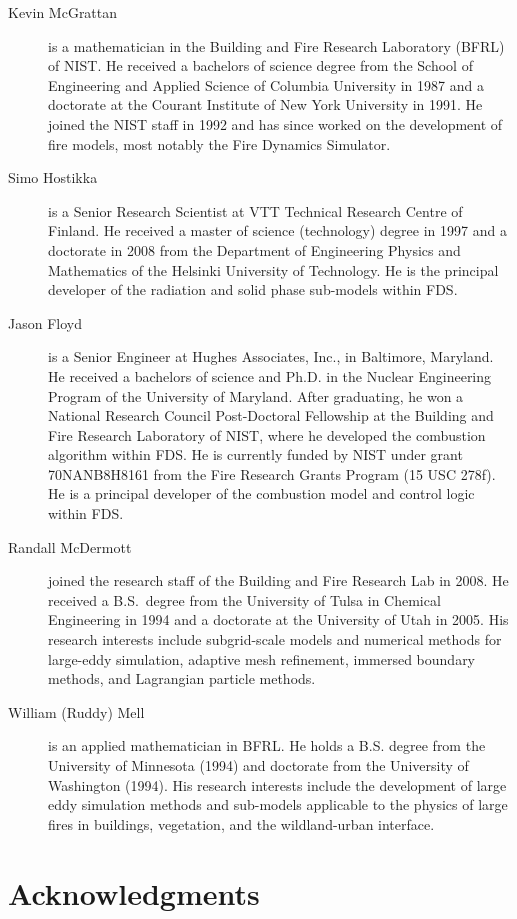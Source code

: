 \documentclass[11pt]{book}
\begin{document}
\begin{description}
\item[Kevin McGrattan] is a mathematician in the Building and Fire Research Laboratory (BFRL) of NIST. He received a bachelors of science degree from the School of Engineering and Applied Science of Columbia University in 1987 and a doctorate at the Courant Institute of New York University in 1991. He joined the NIST staff in 1992 and has since worked on the development of fire models, most notably the Fire Dynamics Simulator.
\item[Simo Hostikka] is a Senior Research Scientist at VTT Technical Research Centre of Finland. He received a master of science (technology) degree in 1997 and a doctorate in 2008 from the Department of Engineering Physics and Mathematics of the Helsinki University of Technology.  He is the principal developer of the radiation and solid phase sub-models within FDS.
\item[Jason Floyd] is a Senior Engineer at Hughes Associates, Inc., in Baltimore, Maryland. He received a bachelors of science and Ph.D. in the Nuclear Engineering Program of the University of Maryland. After graduating, he won a National Research Council Post-Doctoral Fellowship at the Building and Fire Research Laboratory of NIST, where he developed the combustion algorithm within FDS. He is currently funded by NIST under grant 70NANB8H8161 from the Fire Research Grants Program (15 USC 278f). He is a principal developer of the combustion model and control logic within FDS.
\item[Randall McDermott] joined the research staff of the Building and Fire Research Lab in 2008. He received a B.S.~degree from the University of Tulsa in Chemical Engineering in 1994 and a doctorate at the University of Utah in 2005. His research interests include subgrid-scale models and numerical methods for large-eddy simulation, adaptive mesh refinement, immersed boundary methods, and Lagrangian particle methods.
\item[William (Ruddy) Mell] is an applied mathematician in BFRL. He holds a B.S. degree from the University of Minnesota (1994) and doctorate from the University of Washington (1994). His research interests include the development of large eddy simulation methods and sub-models applicable to the physics of large fires in buildings, vegetation, and the wildland-urban interface.
\end{description}


\chapter{Acknowledgments}
\end{document}
